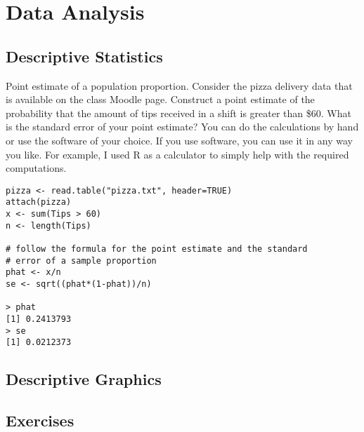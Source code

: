 \chapter{Data Analysis}
\label{data-analysis}

\section{Descriptive Statistics}

Point estimate of a population proportion. Consider the
  pizza delivery data that is available on the class Moodle
  page. Construct a point estimate of the probability that the amount
  of tips received in a shift is greater than \$60. What is the
  standard error of your point estimate? You can do the calculations
  by hand or use the software of your choice. If you use software, you
  can use it in any way you like.  For example, I used R as a
  calculator to simply help with the required computations.
  
\begin{Verbatim}
pizza <- read.table("pizza.txt", header=TRUE)
attach(pizza)
x <- sum(Tips > 60)
n <- length(Tips)

# follow the formula for the point estimate and the standard
# error of a sample proportion
phat <- x/n
se <- sqrt((phat*(1-phat))/n)

> phat
[1] 0.2413793
> se
[1] 0.0212373
\end{Verbatim}


\section{Descriptive Graphics}

\section{Exercises}

